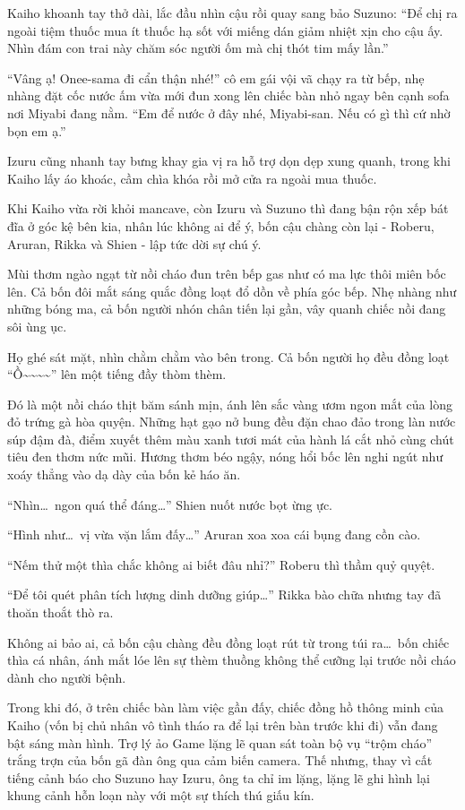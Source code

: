 \documentclass[../main.tex]{subfiles}
\begin{document}
Kaiho khoanh tay thở dài, lắc đầu nhìn cậu rồi quay sang bảo Suzuno: ``Để chị ra ngoài tiệm thuốc mua ít thuốc hạ sốt với miếng dán giảm nhiệt xịn cho cậu ấy. Nhìn đám con trai này chăm sóc người ốm mà chị thót tim mấy lần.''

``Vâng ạ! Onee-sama đi cẩn thận nhé!'' cô em gái vội vã chạy ra từ bếp, nhẹ nhàng đặt cốc nước ấm vừa mới đun xong lên chiếc bàn nhỏ ngay bên cạnh sofa nơi Miyabi đang nằm. ``Em để nước ở đây nhé, Miyabi-san. Nếu có gì thì cứ nhờ bọn em ạ.''

Izuru cũng nhanh tay bưng khay gia vị ra hỗ trợ dọn dẹp xung quanh, trong khi Kaiho lấy áo khoác, cầm chìa khóa rồi mở cửa ra ngoài mua thuốc.

Khi Kaiho vừa rời khỏi mancave, còn Izuru và Suzuno thì đang bận rộn xếp bát đĩa ở góc kệ bên kia, nhân lúc không ai để ý, bốn cậu chàng còn lại - Roberu, Aruran, Rikka và Shien - lập tức dời sự chú ý.

Mùi thơm ngào ngạt từ nồi cháo đun trên bếp gas như có ma lực thôi miên bốc lên. Cả bốn đôi mắt sáng quắc đồng loạt đổ dồn về phía góc bếp. Nhẹ nhàng như những bóng ma, cả bốn người nhón chân tiến lại gần, vây quanh chiếc nồi đang sôi ùng ục.


Họ ghé sát mặt, nhìn chằm chằm vào bên trong. Cả bốn người họ đều đồng loạt ``Ồ\~{}\~{}\~{}\~{}'' lên một tiếng đầy thòm thèm.

Đó là một nồi cháo thịt băm sánh mịn, ánh lên sắc vàng ươm ngon mắt của lòng đỏ trứng gà hòa quyện. Những hạt gạo nở bung đều đặn chao đảo trong làn nước súp đậm đà, điểm xuyết thêm màu xanh tươi mát của hành lá cắt nhỏ cùng chút tiêu đen thơm nức mũi. Hương thơm béo ngậy, nóng hổi bốc lên nghi ngút như xoáy thẳng vào dạ dày của bốn kẻ háo ăn.

``Nhìn\dots\ ngon quá thể đáng\dots'' Shien nuốt nước bọt ừng ực.

``Hình như\dots\ vị vừa vặn lắm đấy\dots'' Aruran xoa xoa cái bụng đang cồn cào.

``Nếm thử một thìa chắc không ai biết đâu nhỉ?'' Roberu thì thầm quỷ quyệt.

``Để tôi quét phân tích lượng dinh dưỡng giúp\dots'' Rikka bào chữa nhưng tay đã thoăn thoắt thò ra.

Không ai bảo ai, cả bốn cậu chàng đều đồng loạt rút từ trong túi ra\dots\ bốn chiếc thìa cá nhân, ánh mắt lóe lên sự thèm thuồng không thể cưỡng lại trước nồi cháo dành cho người bệnh.

Trong khi đó, ở trên chiếc bàn làm việc gần đấy, chiếc đồng hồ thông minh của Kaiho (vốn bị chủ nhân vô tình tháo ra để lại trên bàn trước khi đi) vẫn đang bật sáng màn hình. Trợ lý ảo Game lặng lẽ quan sát toàn bộ vụ ``trộm cháo'' trắng trợn của bốn gã đàn ông qua cảm biến camera. Thế nhưng, thay vì cất tiếng cảnh báo cho Suzuno hay Izuru, ông ta chỉ im lặng, lặng lẽ ghi hình lại khung cảnh hỗn loạn này với một sự thích thú giấu kín.
\end{document}
